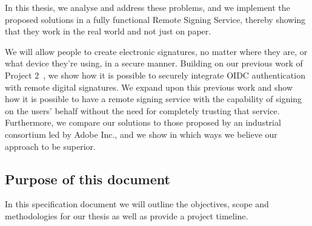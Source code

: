 In this thesis, we analyse and address these problems,
and we implement the proposed solutions in a fully functional Remote Signing Service,
thereby showing that they work in the real world and not just on paper.

We will allow people to create electronic signatures,
no matter where they are, or what device they're using,
in a secure manner.
Building on our previous work of Project 2~\cite{projekt2}, we show how it is possible to securely integrate \gls{OIDC} authentication with remote digital signatures.
We expand upon this previous work and show how it is possible to have a remote signing service with the capability of signing on the users' behalf without the need for completely trusting that service.
Furthermore, we compare our solutions to those proposed by an industrial consortium led by Adobe Inc.,
and we show in which ways we believe our approach to be superior.

\subsection{Purpose of this document}\label{subsec:purpose-of-this-document}

In this specification document we will outline the objectives, scope and methodologies for our thesis as well as provide a project timeline.
